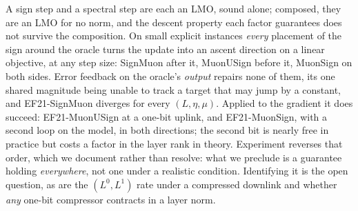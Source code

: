 A sign step and a spectral step are each an LMO, sound alone; composed, they are an LMO for no norm, and the descent property each factor guarantees does not survive the composition. On small explicit instances \emph{every} placement of the sign around the oracle turns the update into an ascent direction on a linear objective, at any step size: SignMuon after it, MuonUSign before it, MuonSign on both sides. Error feedback on the oracle's \emph{output} repairs none of them, its one shared magnitude being unable to track a target that may jump by a constant, and EF21-SignMuon diverges for every $(L,\eta,\mu)$. Applied to the gradient it does succeed: EF21-MuonUSign at a one-bit uplink, and EF21-MuonSign, with a second loop on the model, in both directions; the second bit is nearly free in practice but costs a factor in the layer rank in theory. Experiment reverses that order, which we document rather than resolve: what we preclude is a guarantee holding \emph{everywhere}, not one under a realistic condition. Identifying it is the open question, as are the $(L^0,L^1)$ rate under a compressed downlink and whether \emph{any} one-bit compressor contracts in a layer norm.


